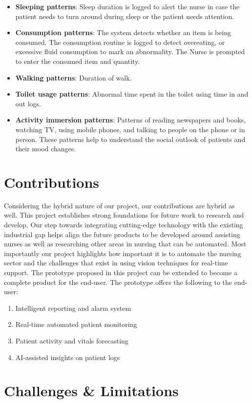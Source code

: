 \begin{itemize}
    \item \textbf{Sleeping patterns}: Sleep duration is logged to alert the nurse in case the patient needs to turn around during sleep or the patient needs attention. 
    \item \textbf{Consumption patterns}: The system detects whether an item is being consumed. The consumption routine is logged to detect overeating, or excessive fluid consumption to mark an abnormality. The Nurse is prompted to enter the consumed item and quantity.
    \item \textbf{Walking patterns}: Duration of walk.
    \item \textbf{Toilet usage patterns}: Abnormal time spent in the toilet using time in and out logs.
    \item \textbf{Activity immersion patterns}: Patterns of reading newspapers and books, watching TV, using mobile phones, and talking to people on the phone or in person. These patterns help to understand the social outlook of patients and their mood changes.
\end{itemize}
\section{Contributions}
Considering the hybrid nature of our project, our contributions are hybrid as well. This project establishes strong foundations for future work to research and develop. Our step towards integrating cutting-edge technology with the existing industrial gap helps align the future products to be developed around assisting nurses as well as researching other areas in nursing that can be automated. Most importantly our project highlights how important it is to automate the nursing sector and the challenges that exist in using vision techniques for real-time support. The prototype proposed in this project can be extended to become a complete product for the end-user. The prototype offers the following to the end-user:
\begin{enumerate}
    \item Intelligent reporting and alarm system 
    \item Real-time automated patient monitoring
    \item Patient activity and vitals forecasting
    \item AI-assisted insights on patient logs
\end{enumerate}

\section{Challenges \& Limitations}

